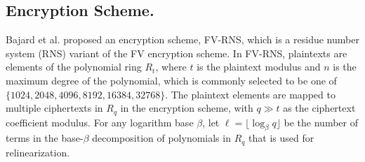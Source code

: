 \documentclass[conference]{IEEEtran}
\begin{document}




\subsection{Encryption Scheme.}
Bajard et al. \cite{bajard2016full} proposed an encryption scheme, FV-RNS, which is a residue number system (RNS) variant of the FV encryption scheme. %
In FV-RNS, plaintexts are elements of the polynomial ring $R_t$, where $t$ is the plaintext modulus and $n$ is the maximum degree of the polynomial, which is commonly selected to be one of $\{1024, 2048, 4096, 8192, 16384, 32768\}$. 
The plaintext elements are mapped to multiple ciphertexts in $R_q$ in the encryption scheme, with $q \gg t$ as the ciphertext coefficient modulus.
For any logarithm base $\beta$, let $\ell = \lfloor {\log_\beta q} \rfloor$ be the number of terms in the base-$\beta$ decomposition of polynomials in $R_q$ that is used for relinearization.%
\end{document}

